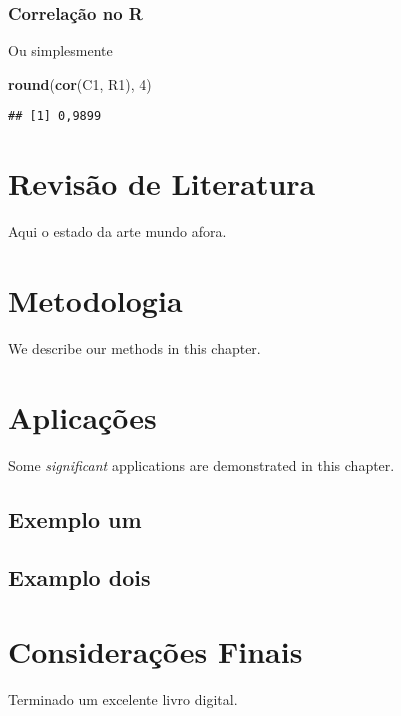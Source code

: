 \documentclass[
]{book}
\newenvironment{Shaded}{\begin{snugshade}}{\end{snugshade}}
\newcommand{\DecValTok}[1]{\textcolor[rgb]{0.00,0.00,0.81}{#1}}
\newcommand{\KeywordTok}[1]{\textcolor[rgb]{0.13,0.29,0.53}{\textbf{#1}}}
\newcommand{\NormalTok}[1]{#1}
\begin{document}
\hypertarget{correlauxe7uxe3o-no-r-1}{%
\subsection{Correlação no R}\label{correlauxe7uxe3o-no-r-1}}

Ou simplesmente

\begin{Shaded}
\begin{Highlighting}[]
\KeywordTok{round}\NormalTok{(}\KeywordTok{cor}\NormalTok{(C1, R1), }\DecValTok{4}\NormalTok{)}
\end{Highlighting}
\end{Shaded}

\begin{verbatim}
## [1] 0,9899
\end{verbatim}

\hypertarget{revisuxe3o-de-literatura}{%
\chapter{Revisão de Literatura}\label{revisuxe3o-de-literatura}}

Aqui o estado da arte mundo afora.

\hypertarget{metodologia}{%
\chapter{Metodologia}\label{metodologia}}

We describe our methods in this chapter.

\hypertarget{aplicauxe7uxf5es}{%
\chapter{Aplicações}\label{aplicauxe7uxf5es}}

Some \emph{significant} applications are demonstrated in this chapter.

\hypertarget{exemplo-um}{%
\section{Exemplo um}\label{exemplo-um}}

\hypertarget{examplo-dois}{%
\section{Examplo dois}\label{examplo-dois}}

\hypertarget{considerauxe7uxf5es-finais}{%
\chapter{Considerações Finais}\label{considerauxe7uxf5es-finais}}

Terminado um excelente livro digital.

  
\end{document}

